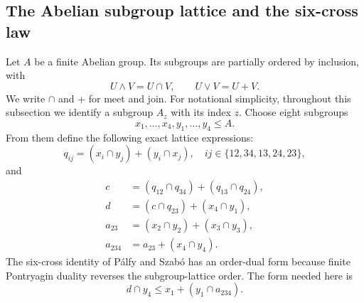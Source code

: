 \documentclass[journal]{IEEEtran}
\begin{document}
\subsection{The Abelian subgroup lattice and the six-cross law}\label{sec:six-cross-lattice}
Let $A$ be a finite Abelian group.  Its subgroups are partially ordered by
inclusion, with
\[
   U\wedge V=U\cap V,
   \qquad
   U\vee V=U+V.
\]
We write $\cap$ and $+$ for meet and join.  For notational simplicity,
throughout this subsection we identify a subgroup $A_z$ with its index $z$.
Choose eight subgroups
\[
 x_1,\ldots,x_4,y_1,\ldots,y_4\le A.
\]
From them define the following exact lattice expressions:
\begin{equation}\label{eq:q-def}
 q_{ij}=(x_i\cap y_j)+(y_i\cap x_j),
 \quad ij\in\{12,34,13,24,23\},
\end{equation}
and
\begin{align}
 c&=(q_{12}\cap q_{34})+(q_{13}\cap q_{24}),\label{eq:c-def}\\
 d&=(c\cap q_{23})+(x_4\cap y_1),\label{eq:d-def}\\
 a_{23}&=(x_2\cap y_2)+(x_3\cap y_3),\label{eq:a23-def}\\
 a_{234}&=a_{23}+(x_4\cap y_4).\label{eq:a234-def}
\end{align}
The six-cross identity of P\'alfy and Szab\'o has an order-dual form because
finite Pontryagin duality reverses the subgroup-lattice order.  The form needed
here is
\begin{equation}\label{eq:six-cross}
  d\cap y_4\le x_1+(y_1\cap a_{234}).
\end{equation}
\end{document}
